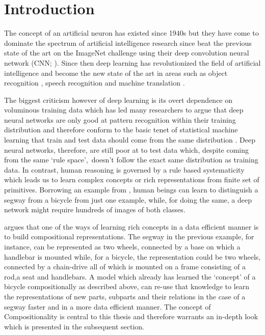 \chapter{Introduction}\label{Chpater:intro}
	
The concept of an artificial neuron has existed since 1940s \citep{McCulloch1943} but they have come to dominate the spectrum of artificial intelligence research since \cite{Krizhevsky2012} beat the previous state of the art on the ImageNet challenge \citep{Deng2009} using their deep convolution neural network (CNN; \citep{Lecun89}). Since then deep learning has revolutionized the field of artificial intelligence and become the new state of the art in areas such as object recognition \citep{He2015}, speech recognition \citep{Graves2013} and machine translation \citep{Sutskever2014}.

The biggest criticism however of deep learning is its overt dependence on voluminous training data which has led many researchers to argue that deep neural networks are only good at pattern recognition within their training distribution \citep{Marcus2018} and therefore conform to the basic tenet of statistical machine learning that train and test data should come from the same distribution \citep{Zadrozny:2004:LEC:1015330.1015425}. Deep neural networks, therefore, are still poor at to test data which, despite coming from the same \lq rule space{}\rq,\ doesn't follow the exact same distribution as training data. In contrast, human reasoning is governed by a rule based systematicity \citep{FODOR19883} which leads us to learn complex concepts or rich representations from finite set of primitives. Borrowing an example from \cite{Lake2016}, human beings can learn to distinguish a segway from a bicycle from just one example, while, for doing the same, a deep network might require hundreds of images of both classes. 

\cite{Lake2016} argues that one of the ways of learning rich concepts in a data efficient manner is to build compositional representations. The segway in the previous example, for instance, can be represented as two wheels, connected by a base on which a handlebar is mounted while, for a bicycle, the representation could be two wheels, connected by a chain-drive all of which is mounted on a frame consisting of a rod,a seat and handlebars. A model which already has learned the \lq concept\rq{} of a bicycle compositionally as described above, can re-use that knowledge to learn the representations of new parts, subparts and their relations in the case of a segway faster and in a more data efficient manner. The concept of Compositionality is central to this thesis and therefore warrants an in-depth look which is presented in the subsequent section.

